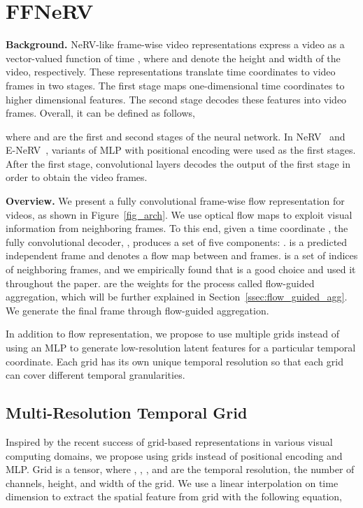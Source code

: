 \documentclass[sigconf]{acmart}
\begin{document}
\section{FFNeRV}

\noindent\textbf{Background.} NeRV-like frame-wise video representations express a video as a vector-valued function of time , where  and  denote the height and width of the video, respectively.
These representations translate time coordinates to video frames in two stages.
The first stage maps one-dimensional time coordinates to higher dimensional features.
The second stage decodes these features into video frames.
Overall, it can be defined as follows,

where  and  are the first and second stages of the neural network.
In NeRV~\cite{nerv} and E-NeRV~\cite{enerv}, variants of MLP with positional encoding were used as the first stages.
After the first stage, convolutional layers decodes the output of the first stage in order to obtain the video frames.


\noindent\textbf{Overview.} We present a fully convolutional frame-wise flow representation for videos, as shown in Figure~\ref{fig_arch}.
We use optical flow maps to exploit visual information from neighboring frames.
To this end, given a time coordinate , the fully convolutional decoder, , produces a set of five components: .
 is a predicted independent frame and  denotes a flow map between  and  frames.
 is a set of indices of neighboring frames, and we empirically found that  is a good choice and used it throughout the paper.
 are the weights for the process called flow-guided aggregation, which will be further explained in Section~\ref{ssec:flow_guided_agg}.
We generate the final frame through flow-guided aggregation.

In addition to flow representation, we propose to use multiple grids instead of using an MLP to generate low-resolution latent features for a particular temporal coordinate.
Each grid has its own unique temporal resolution so that each grid can cover different temporal granularities.


\subsection{Multi-Resolution Temporal Grid}
Inspired by the recent success of grid-based representations in various visual computing domains, we propose using grids instead of positional encoding and MLP.
Grid  is a tensor, where , , , and  are the temporal resolution, the number of channels, height, and width of the grid.
We use a linear interpolation on time dimension to extract the spatial feature  from grid  with the following equation,
\end{document}
